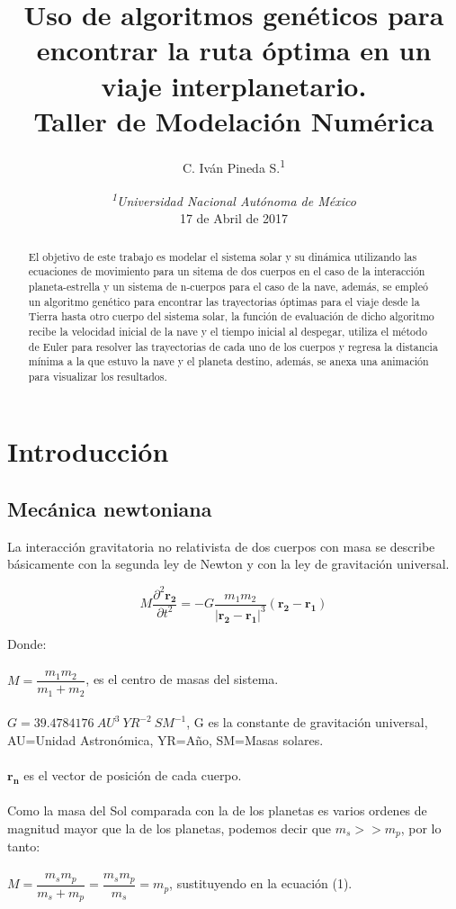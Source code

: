 \documentclass[12pt,letterpaper]{article}
\author{C. Iván Pineda S.\textsuperscript{1} }
\title{Uso de algoritmos genéticos para encontrar la ruta óptima en un viaje interplanetario.\\ Taller de Modelación Numérica}
\date {\textit{\textsuperscript{1}Universidad Nacional Autónoma de México}
\\ 17 de Abril de 2017}
\begin{document}
\maketitle

\begin{abstract}
El objetivo de este trabajo es modelar el sistema solar y su dinámica utilizando las ecuaciones de movimiento para un sitema de dos cuerpos en el caso de la interacción planeta-estrella y un sistema de n-cuerpos para el caso de la nave, además, se empleó un algoritmo genético para encontrar las trayectorias óptimas para el viaje desde la Tierra hasta otro cuerpo del sistema solar, la función de evaluación de dicho algoritmo recibe la velocidad inicial de la nave y el tiempo inicial al despegar, utiliza el método de Euler para resolver las trayectorias de cada uno de los cuerpos y regresa la distancia mínima a la que estuvo la nave y el planeta destino, además, se anexa una animación para visualizar los resultados.
\end{abstract}


\section*{Introducción}

\subsection*{Mecánica newtoniana}

La interacción gravitatoria no relativista de dos cuerpos con masa se describe básicamente con la segunda ley de Newton y con la ley de gravitación universal.

\begin{equation}
 M\dfrac{\partial ^2 \mathbf{r_2}}{\partial t^2}=-G\dfrac{m_1m_2}{|\mathbf{r_{2}}-\mathbf{r_1}|^3}(\mathbf{r_{2}}-\mathbf{r_1})
\end{equation} 

Donde:
\\
\\
$M=\dfrac{m_1m_2}{m_1+m_2}$, es el centro de masas del sistema.
\\
\\
$G=39.4784176 \ AU^3 \ YR^{-2} \ SM^{-1}$, G es la constante de gravitación universal, AU=Unidad Astronómica, YR=Año, SM=Masas solares.
\\
\\
$\mathbf{r_n} $ es el vector de posición de cada cuerpo.
\\
\\
Como la masa del Sol comparada con la de los planetas es varios ordenes de magnitud mayor que la de los planetas, podemos decir que $m_s>>m_p$, por lo tanto:
\\
\\
$M=\dfrac{m_sm_p}{m_s+m_p}=\dfrac{m_sm_p}{m_s}=m_p$, sustituyendo en la ecuación (1).
\end{document}
